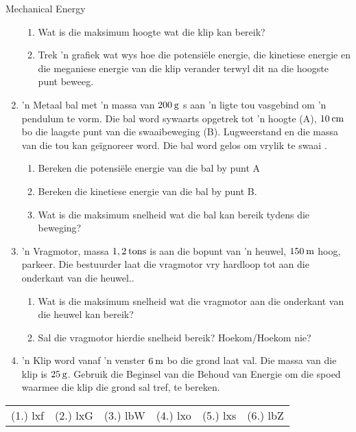 \begin{eocexercises}{Mechanical Energy}
\begin{enumerate}[noitemsep, label=\textbf{\arabic*}. ]
\label{m38786*id71971}\begin{enumerate}[noitemsep, label=\textbf{\alph*}. ] 
            \label{m38786*uid133}\item Wat is die maksimum hoogte wat die klip kan bereik?
\label{m38786*uid134}\item Trek   'n grafiek wat wys hoe die potensiële energie, die kinetiese energie en die meganiese energie van die klip verander terwyl dit na die hoogste punt beweeg.
\end{enumerate}
                  \label{m38786*uid135}\item   'n Metaal bal met   'n massa van  $200\phantom{\rule{2pt}{0ex}}\text{g}$ s aan   'n ligte tou vasgebind om   'n pendulum te vorm. Die bal word sywaarts opgetrek tot   'n hoogte (A), $10\phantom{\rule{2pt}{0ex}}\text{cm}$ bo die laagste punt van die swaaibeweging (B). Lugweerstand en die massa van die tou kan geïgnoreer word. Die bal word gelos om vrylik te swaai .
\label{m38786*id72026}\begin{enumerate}[noitemsep, label=\textbf{\alph*}. ] 
            \label{m38786*uid136}\item Bereken die potensiële energie van die bal by punt A
\label{m38786*uid137}\item Bereken die kinetiese energie van die bal by punt B.
\label{m38786*uid138}\item Wat is die maksimum snelheid wat die bal kan bereik tydens die beweging?
\end{enumerate}
                \label{m38786*uid139}\item   'n Vragmotor, massa $1,2\phantom{\rule{2pt}{0ex}}\text{tons}$ is aan die bopunt van   'n heuwel,  $150\phantom{\rule{2pt}{0ex}}\text{m}$ hoog, parkeer. Die bestuurder laat die vragmotor vry hardloop tot aan die onderkant van die heuwel..
\label{m38786*id72082}\begin{enumerate}[noitemsep, label=\textbf{\alph*}. ] 
            \label{m38786*uid140}\item Wat is die maksimum snelheid wat die vragmotor aan die onderkant van die heuwel kan bereik?
\label{m38786*uid141}\item Sal die vragmotor hierdie snelheid bereik? Hoekom/Hoekom nie?
\end{enumerate}
                \label{m38786*uid142}\item   'n Klip word vanaf   'n venster $6\phantom{\rule{2pt}{0ex}}\text{m}$ bo die grond laat val. Die massa van die klip is $25\phantom{\rule{2pt}{0ex}}\text{g}$.
Gebruik die Beginsel van die Behoud van Energie om die spoed waarmee die klip die grond sal tref, te bereken.
           \end{enumerate}
  \label{m38786**end}
  \label{1fc5ba69690764517c30802fdf7b1905**end}
\practiceinfo
 \par \begin{tabular}[h]{cccccc}
 (1.) lxf  &  (2.) lxG  &  (3.) lbW  &  (4.) lxo  &  (5.) lxs  &  (6.) lbZ  & \end{tabular}
\end{eocexercises}
